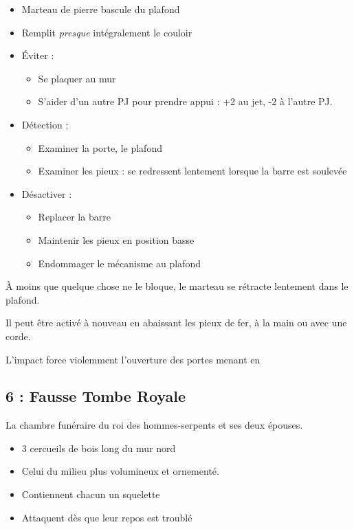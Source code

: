 \begin{highlight}[Le piège]
  \begin{itemize}
    \item Marteau de pierre bascule du plafond
    \item Remplit \emph{presque} intégralement le couloir
    \item \'Eviter :
    \begin{itemize}
      \item Se plaquer au mur
      \item S'aider d'un autre PJ pour prendre appui : +2 au jet, -2 à l'autre PJ.
    \end{itemize}
    \item Détection :
    \begin{itemize}
      \item Examiner la porte, le plafond
      \item Examiner les pieux : se redressent lentement lorsque la barre est soulevée
    \end{itemize}
    \item Désactiver :
    \begin{itemize}
      \item Replacer la barre
      \item Maintenir les pieux en position basse
      \item Endommager le mécanisme au plafond
    \end{itemize}
  \end{itemize}
\end{highlight}


À moins que quelque chose ne le bloque, le marteau se rétracte lentement dans le plafond.

Il peut être activé à nouveau en abaissant les pieux de fer, à la main ou avec une corde.

L’impact force violemment l’ouverture des portes menant en \textbf{}


\subsection{6 : Fausse Tombe Royale}\label{n1:s6}
La chambre funéraire du roi des hommes-serpents et ses deux épouses.
\begin{itemize}
  \item 3 cercueils de bois long du mur nord
  \item Celui du milieu plus volumineux et ornementé.
  \item Contiennent chacun un squelette
  \item Attaquent dès que leur repos est troublé
\end{itemize}

